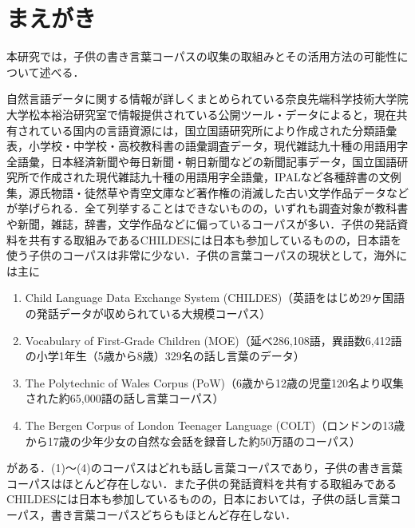 \documentclass[japanese]{jnlp_1.4}
\begin{document}
\maketitle



\section{まえがき}

本研究では，子供の書き言葉コーパスの収集の取組みとその活用方法の可能性について述べる．

自然言語データに関する情報が詳しくまとめられている奈良先端科学技術大学院大学松本裕治研究室\cite[\texttt{http://cl.aist-nara.ac.jp/index.php}]{Web_NAIST}で情報提供されている公開ツール・データによると，現在共有されている国内の言語資源には，国立国語研究所により作成された分類語彙表，小学校・中学校・高校教科書の語彙調査データ，現代雑誌九十種の用語用字全語彙，日本経済新聞や毎日新聞・朝日新聞などの新聞記事データ，国立国語研究所で作成された現代雑誌九十種の用語用字全語彙，IPALなど各種辞書の文例集，源氏物語・徒然草や青空文庫など著作権の消滅した古い文学作品データなどが挙げられる．全て列挙することはできないものの，いずれも調査対象が教科書や新聞，雑誌，辞書，文学作品などに偏っているコーパスが多い．子供の発話資料を共有する取組みであるCHILDESには日本も参加しているものの，日本語を使う子供のコーパスは非常に少ない．子供の言葉コーパスの現状として，海外には主に

\begin{enumerate}
\item Child Language Data Exchange System (CHILDES)（英語をはじめ29ヶ国語の発話データが収められている大規模コーパス）
\item Vocabulary of First-Grade Children (MOE)（延べ286,108語，異語数6,412語の小学1年生（5歳から8歳）329名の話し言葉のデータ）
\item The Polytechnic of Wales Corpus (PoW)（6歳から12歳の児童120名より収集された約65,000語の話し言葉コーパス）
\item The Bergen Corpus of London Teenager Language (COLT)（ロンドンの13歳から17歳の少年少女の自然な会話を録音した約50万語のコーパス）
\end{enumerate}

\noindent
がある．(1)〜(4)のコーパスはどれも話し言葉コーパスであり，子供の書き言葉コーパスはほとんど存在しない．また子供の発話資料を共有する取組みであるCHILDESには日本も参加しているものの，日本においては，子供の話し言葉コーパス，書き言葉コーパスどちらもほとんど存在しない．
\end{document}
